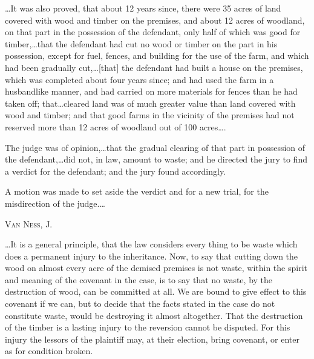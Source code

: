 \dots It was also proved, that about 12 years since, there were 35 acres of
land covered with wood and timber on the premises, and about 12 acres of
woodland, on that part in the possession of the defendant, only half of which
was good for timber,\dots that the defendant had cut no wood or timber on
the part in his possession, except for fuel, fences, and building for the use
of the farm, and which had been gradually cut,\dots [that] the defendant had
built a house on the premises, which was completed about four years since; and
had used the farm in a husbandlike manner, and had carried on more materials
for fences than he had taken off; that\dots cleared land was of much greater
value than land covered with wood and timber; and that good farms in the
vicinity of the premises had not reserved more than 12 acres of woodland out of
100 acres\dots.

The judge was of opinion,\dots that the gradual clearing of that part in
possession of the defendant,\dots did not, in law, amount to waste; and he
directed the jury to find a verdict for the defendant; and the jury found
accordingly.

A motion was made to set aside the verdict and for a new trial, for the
misdirection of the judge.\dots

\opinion \textsc{Van Ness}, J.

\dots It is a general principle, that the law considers every thing to be
waste which does a permanent injury to the inheritance. Now, to say that
cutting down the wood on almost every acre of the demised premises is not
waste, within the spirit and meaning of the covenant in the case, is to say
that no waste, by the destruction of wood, can be committed at all. We are
bound to give effect to this covenant if we can, but to decide that the facts
stated in the case do not constitute waste, would be destroying it almost
altogether. That the destruction of the timber is a lasting injury to the
reversion cannot be disputed. For this injury the lessors of the plaintiff may,
at their election, bring covenant, or enter as for condition broken. 

